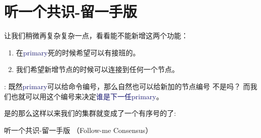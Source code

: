 \documentclass[dvipsnames]{ctexart}
\newcommand{\mycola}{MidnightBlue}
\newcommand{\cola}[1]{\textcolor{\mycola}{#1}}
\begin{document}
\section{听一个共识-留一手版}

让我们稍微再复杂复杂一点，看看能不能新增这两个功能：
\begin{enumerate}
\item 在\cola{primary}死的时候希望可以有接班的。
\item 我们希望新增节点的时候可以连接到任何一个节点。
\end{enumerate}
 : 既然\cola{primary}可以给命令编号，那么自然也可以给新加的节点编号
不是吗？ 而我们也就可以用这个编号来决定\cola{谁是下一任primary}。

是的那么这样以来我们的集群就变成了一个有序号的了:


\begin{myBox}{听一个共识-留一手版 （Follow-me Consensus）}
  
\end{myBox}
\end{document}
